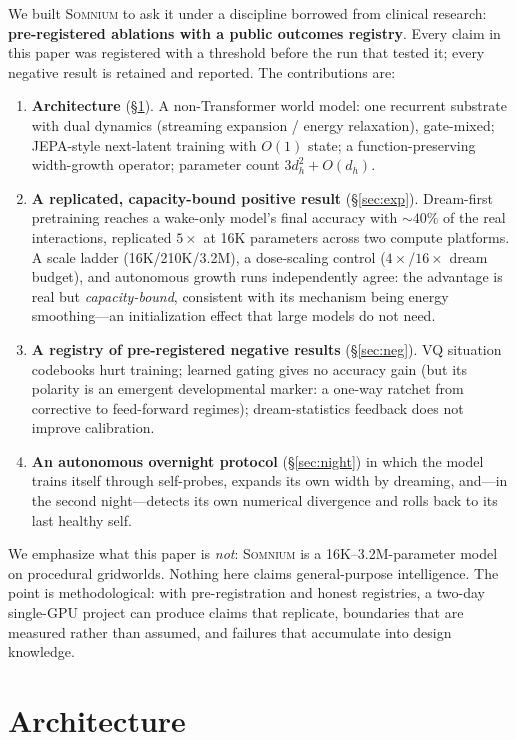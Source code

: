 \documentclass[11pt,a4paper]{article}
\newcommand{\som}{\textsc{Somnium}}
\begin{document}
We built \som{} to ask it under a discipline borrowed from clinical research: \textbf{pre-registered ablations with a public outcomes registry}. Every claim in this paper was registered with a threshold before the run that tested it; every negative result is retained and reported. The contributions are:

\begin{enumerate}[leftmargin=1.6em,itemsep=1pt,topsep=2pt]
\item \textbf{Architecture} (\S\ref{sec:arch}). A non-Transformer world model: one recurrent substrate with dual dynamics (streaming expansion / energy relaxation), gate-mixed; JEPA-style next-latent training with $O(1)$ state; a function-preserving width-growth operator; parameter count $3d_h^2 + O(d_h)$.
\item \textbf{A replicated, capacity-bound positive result} (\S\ref{sec:exp}). Dream-first pretraining reaches a wake-only model's final accuracy with ${\sim}40\%$ of the real interactions, replicated $5\times$ at 16K parameters across two compute platforms. A scale ladder (16K/210K/3.2M), a dose-scaling control ($4\times$/$16\times$ dream budget), and autonomous growth runs independently agree: the advantage is real but \emph{capacity-bound}, consistent with its mechanism being energy smoothing---an initialization effect that large models do not need.
\item \textbf{A registry of pre-registered negative results} (\S\ref{sec:neg}). VQ situation codebooks hurt training; learned gating gives no accuracy gain (but its polarity is an emergent developmental marker: a one-way ratchet from corrective to feed-forward regimes); dream-statistics feedback does not improve calibration.
\item \textbf{An autonomous overnight protocol} (\S\ref{sec:night}) in which the model trains itself through self-probes, expands its own width by dreaming, and---in the second night---detects its own numerical divergence and rolls back to its last healthy self.
\end{enumerate}

We emphasize what this paper is \emph{not}: \som{} is a 16K--3.2M-parameter model on procedural gridworlds. Nothing here claims general-purpose intelligence. The point is methodological: with pre-registration and honest registries, a two-day single-GPU project can produce claims that replicate, boundaries that are measured rather than assumed, and failures that accumulate into design knowledge.

\section{Architecture}\label{sec:arch}
\end{document}
